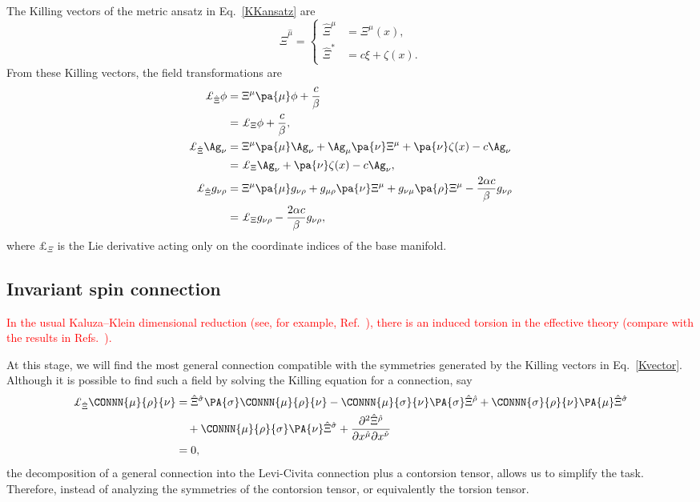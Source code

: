 \documentclass[aps,prd,12pt,superscriptaddress,showpacs,showkeys,reprint]{revtex4-1}
\begin{document}
The Killing vectors of the metric ansatz in Eq.~\eqref{KKansatz} are 
\begin{equation}
  \hat{\Xi}^{\hat{\mu}} =
  \begin{cases}
    \hat{\Xi}^\mu &= \Xi^\mu(x), \\
    \hat{\Xi}^*  &= c \xi + \zeta(x).
  \end{cases}
  \label{Kvector}
\end{equation}
From these Killing vectors, the field transformations are
\begin{align}
  \label{Liephi}
  \pounds_{\hat{\Xi}} \phi    &= \Xi^\mu \pa{\mu} \phi + \frac{c}{\beta} \\
  &= \pounds_\Xi \phi + \frac{c}{\beta}, \notag \\
  \label{LieA}
  \pounds_{\hat{\Xi}} \Ag_\nu  &= \Xi^\mu \pa{\mu} \Ag_\nu + \Ag_\mu \pa{\nu} \Xi^\mu + \pa{\nu} \zeta(x) - c \Ag_\nu \\
  &= \pounds_{\Xi} \Ag_\nu + \pa{\nu} \zeta(x) - c \Ag_\nu, \notag \\
  \label{Lieg}
  \pounds_{\hat{\Xi}} g_{\nu\rho} &= \Xi^\mu \pa{\mu} g_{\nu\rho} + g_{\mu\rho} \pa{\nu} \Xi^\mu + g_{\nu\mu} \pa{\rho} \Xi^\mu - \frac{2\alpha c}{\beta} g_{\nu\rho} \\
  &= \pounds_\Xi g_{\nu\rho} - \frac{2\alpha c}{\beta} g_{\nu\rho}, \notag
\end{align}
where $\pounds_\Xi$ is the Lie derivative acting only on the coordinate indices of the base manifold.


\subsection*{Invariant spin connection}

\textcolor{red}{In the usual Kaluza--Klein dimensional reduction (see, for example, Ref.~\cite{PopeKK}), there is an induced torsion in the effective theory (compare with the results in Refs.~\cite{PhysRevD.17.3141,PhysRevD.19.430}).}

At this stage, we will find the most general connection compatible with the symmetries generated by the Killing vectors in Eq.~\eqref{Kvector}. Although it is possible to find such a field by solving the Killing equation for a connection, say~\cite{Tilquin:2011bu}
\begin{equation}
  \begin{split}
    \pounds_{\hat{\Xi}} \CONNN{\mu}{\rho}{\nu} &= \hat{\Xi}^{\hat{\sigma}} \PA{\sigma} \CONNN{\mu}{\rho}{\nu} - \CONNN{\mu}{\sigma}{\nu} \PA{\sigma} \hat{\Xi}^{\hat{\rho}} + \CONNN{\sigma}{\rho}{\nu} \PA{\mu} \hat{\Xi}^{\hat{\sigma}} \\
    & \quad + \CONNN{\mu}{\rho}{\sigma} \PA{\nu} \hat{\Xi}^{\hat{\sigma}} + \frac{ \partial^2 \hat{\Xi}^{\hat{\rho}} }{ \partial x^{\hat{\mu}} \partial x^{\hat{\nu}}} \\
    &= 0,
  \end{split}
\end{equation}
the decomposition of a general connection into the Levi-Civita connection plus a contorsion tensor, allows us to simplify the task. Therefore, instead of analyzing the symmetries of the contorsion tensor, or equivalently the torsion tensor.
\end{document}
